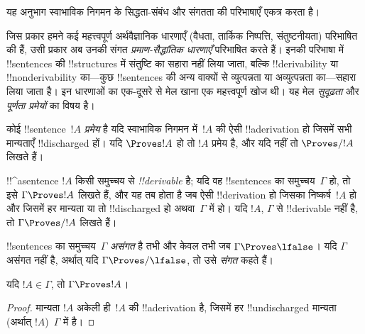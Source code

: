 \documentclass[../../../include/open-logic-section]{subfiles}
\begin{document}
      {}
      {}


\begin{editorial}
यह अनुभाग स्वाभाविक निगमन के सिद्धता-संबंध और संगतता की परिभाषाएँ एकत्र
करता है।
\end{editorial}

\begin{explain}
जिस प्रकार हमने कई महत्त्वपूर्ण अर्थवैज्ञानिक धारणाएँ (वैधता, तार्किक
निष्पत्ति, संतुष्टनीयता) परिभाषित की हैं, उसी प्रकार अब उनकी संगत
\emph{प्रमाण-सैद्धांतिक धारणाएँ} परिभाषित करते हैं। इनकी परिभाषा में
!!{sentence}s की !!{structure}s में संतुष्टि का सहारा नहीं लिया जाता, बल्कि
!!{derivability} या !!{nonderivability} का—कुछ !!{sentence}s की अन्य वाक्यों
से व्युत्पन्नता या अव्युत्पन्नता का—सहारा लिया जाता है। इन धारणाओं का एक-दूसरे से मेल खाना एक महत्त्वपूर्ण
खोज थी। यह मेल \emph{सुदृढ़ता} और \emph{पूर्णता प्रमेयों} का विषय है।
\end{explain}


\begin{defn}[प्रमेय]
कोई !!{sentence}~$!A$ \emph{प्रमेय} है यदि स्वाभाविक निगमन में~$!A$ की ऐसी
!!a{derivation} हो जिसमें सभी मान्यताएँ !!{discharged} हों। यदि $\Proves !A$
हो तो $!A$ प्रमेय है, और यदि नहीं तो $\Proves/ !A$ लिखते हैं।
\end{defn}

\begin{defn}[!!^{derivability}]
!!^a{sentence} $!A$ किसी समुच्चय से \emph{!!{derivable}} है; यदि वह
!!{sentence}s का समुच्चय~$\Gamma$ हो, तो इसे $\Gamma \Proves !A$ लिखते हैं,
और यह तब होता है जब ऐसी
!!{derivation} हो जिसका निष्कर्ष~$!A$ हो और जिसमें हर मान्यता या तो
!!{discharged} हो अथवा~$\Gamma$ में हो। यदि $!A$, $\Gamma$ से
!!{derivable} नहीं है, तो $\Gamma \Proves/ !A$ लिखते हैं।
\end{defn}

\begin{defn}[संगतता]
!!{sentence}s का समुच्चय~$\Gamma$ \emph{असंगत} है तभी और केवल तभी जब $\Gamma
\Proves \lfalse$। यदि $\Gamma$ असंगत नहीं है, अर्थात् यदि
$\Gamma \Proves/ \lfalse$, तो उसे \emph{संगत} कहते हैं।
\end{defn}

\begin{prop}[स्वतुल्यता]
यदि $!A \in \Gamma$, तो $\Gamma \Proves !A$।
\end{prop}

\begin{proof}
मान्यता $!A$ अकेली ही~$!A$ की !!a{derivation} है, जिसमें हर
!!{undischarged} मान्यता (अर्थात् $!A$)~$\Gamma$ में है।
\end{proof}
  
\end{document}
